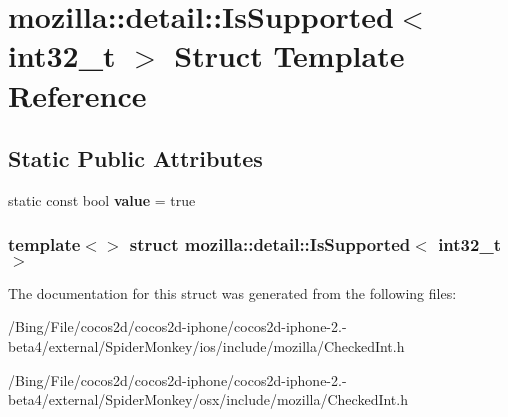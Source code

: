 \hypertarget{structmozilla_1_1detail_1_1_is_supported_3_01int32__t_01_4}{\section{mozilla\-:\-:detail\-:\-:Is\-Supported$<$ int32\-\_\-t $>$ Struct Template Reference}
\label{structmozilla_1_1detail_1_1_is_supported_3_01int32__t_01_4}
}
\subsection*{Static Public Attributes}
\begin{DoxyCompactItemize}
\item 
\hypertarget{structmozilla_1_1detail_1_1_is_supported_3_01int32__t_01_4_a04117114a72442a11c855ac1c4083c91}{static const bool {\bfseries value} = true}\label{structmozilla_1_1detail_1_1_is_supported_3_01int32__t_01_4_a04117114a72442a11c855ac1c4083c91}

\end{DoxyCompactItemize}
\subsubsection*{template$<$$>$ struct mozilla\-::detail\-::\-Is\-Supported$<$ int32\-\_\-t $>$}



The documentation for this struct was generated from the following files\-:\begin{DoxyCompactItemize}
\item 
/\-Bing/\-File/cocos2d/cocos2d-\/iphone/cocos2d-\/iphone-\/2.-\/beta4/external/\-Spider\-Monkey/ios/include/mozilla/Checked\-Int.\-h\item 
/\-Bing/\-File/cocos2d/cocos2d-\/iphone/cocos2d-\/iphone-\/2.-\/beta4/external/\-Spider\-Monkey/osx/include/mozilla/Checked\-Int.\-h\end{DoxyCompactItemize}
